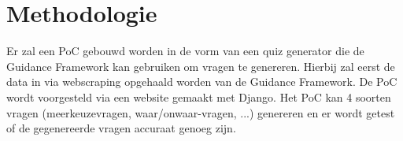 





\section{Methodologie}%
\label{sec:methodologie}
Er zal een PoC gebouwd worden in de vorm van een quiz generator die de Guidance Framework kan gebruiken om vragen te genereren. Hierbij zal eerst de data in via webscraping opgehaald worden van de Guidance Framework. De PoC wordt voorgesteld via een website gemaakt met Django. Het PoC kan 4 soorten vragen (meerkeuzevragen, waar/onwaar-vragen, ...) genereren en er wordt getest of de gegenereerde vragen accuraat genoeg zijn. 

